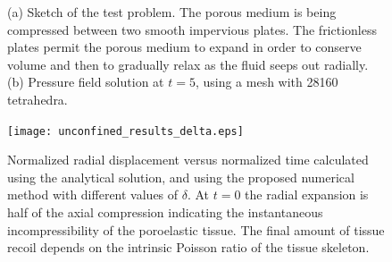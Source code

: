 \begin{figure}[H]
  \centering
  \label{fig:animals}
\caption{ (a) Sketch of the test problem. The porous medium is being compressed between two smooth impervious plates. The frictionless plates permit the porous medium to expand in order to conserve volume and then to gradually relax as the fluid seeps out radially. (b) Pressure field solution at $t=5$, using a mesh with 28160 tetrahedra.}
\end{figure}
 \begin{figure}[H]
\begin{center}
\texttt{[image: unconfined\_results\_delta.eps]}
\caption{Normalized radial displacement versus normalized time calculated using the analytical
solution, and using the proposed numerical method with different values of $\delta$. At $t=0$ the radial expansion is half of the axial compression indicating the instantaneous incompressibility of the poroelastic tissue. The final amount of tissue recoil depends on the intrinsic Poisson ratio of the tissue skeleton.}
\label{fig:anal_unconfined_plot}
\end{center}
\end{figure}
